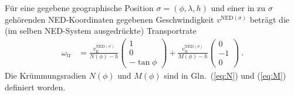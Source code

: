 \documentclass[10pt,a4paper]{article}
\begin{document}
Für eine gegebene geographische Position $\sigma=(\phi,\lambda,h)$ und einer in zu $\sigma$ gehörenden NED-Koordinaten gegebenen Geschwindigkeit
$v^{\mathrm{NED}(\sigma)}$ beträgt die (im selben NED-System ausgedrückte) Transportrate
\begin{align}
	\omega_{\mathrm{tr}}
	&=         
	\frac{v_{\mathrm{E}}^{\mathrm{NED}(\sigma)}}
         {N(\phi) - h}
	\begin{pmatrix}
		1 \\ 0 \\ -\tan\phi
	\end{pmatrix}
	+
	\frac{v_{\mathrm{N}}^{\mathrm{NED}(\sigma)}}
         {M(\phi) - h}
	\begin{pmatrix}
		0 \\ -1 \\ 0
	\end{pmatrix}    	
	\ .
\end{align}
Die Krümmungsradien $N(\phi)$ und $M(\phi)$ sind in Gln.~(\ref{eq:N}) und (\ref{eq:M}) definiert worden.
\end{document}
